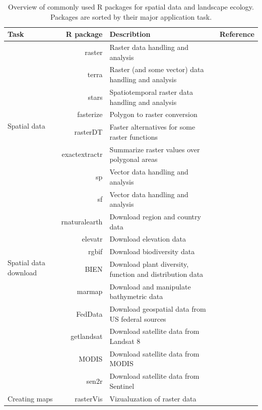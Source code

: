 \documentclass[smallextended]{svjour3}       %
\begin{document}
\begin{table}

\caption{Overview of commonly used R packages for spatial data and landscape ecology. Packages are sorted by their major application task.}

\begin{tabularx}{450pt}{lrXr}

\hline
Task & R package & Describtion & Reference \\
\hline
\multirow{8}{*}{Spatial data} & raster & Raster data handling and analysis & \cite{Hijmans2019} \\
& terra & Raster (and some vector) data handling and analysis & \cite{R-terra} \\
& stars & Spatiotemporal raster data handling and analysis & \cite{Pebesma2019} \\
& fasterize & Polygon to raster conversion & \cite{Ross2020} \\
& rasterDT & Faster alternatives for some raster functions & \cite{OBrien2020} \\
& exactextractr & Summarize raster values over polygonal areas & \cite{Baston2020} \\
& sp & Vector data handling and analysis & \cite{Pebesma2005,Bivand2013} \\
& sf & Vector data handling and analysis & \cite{Pebesma2018} \\
\hline
\multirow{6}{*}{Spatial data download} & rnaturalearth & Download region and country data & \cite{South2017} \\
& elevatr & Download elevation data & \cite{R-elevatr} \\
& rgbif & Download biodiversity data & \cite{R-rgbif} \\
& BIEN & Download plant diversity, function and distribution data & \cite{Maitner2020} \\
& marmap & Download and manipulate bathymetric data & \cite{Pante2013} \\
& FedData & Download geospatial data from US federal sources & \cite{R-FedData} \\
& getlandsat & Download satellite data from Landsat 8 & \cite{Chamberlain2018} \\
& MODIS & Download satellite data from MODIS & \cite{Mattiuzzi2020} \\
& sen2r & Download satellite data from Sentinel & \cite{R-sen2r} \\
\hline
\multirow{7}{*}{Creating maps} & rasterVis & Vizualuzation of raster data & \cite{Lamigueiro2020} \\

\end{tabularx}
\end{table}
\end{document}
